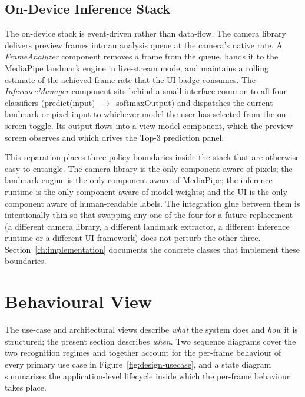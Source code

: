 \subsection{On-Device Inference Stack}
\label{sec:design-arch-ondevice}

The on-device stack is event-driven rather than data-flow. The
camera library delivers preview frames into an analysis queue at
the camera's native rate. A \emph{FrameAnalyzer} component removes
a frame from the queue, hands it to the MediaPipe landmark engine
in live-stream mode, and maintains a rolling estimate of the
achieved frame rate that the UI badge consumes. The
\emph{InferenceManager} component sits behind a small interface
common to all four classifiers
(\textsf{predict(input)}~$\to$~\textsf{softmaxOutput}) and
dispatches the current landmark or pixel input to whichever model
the user has selected from the on-screen toggle. Its output flows
into a view-model component, which the preview screen observes and
which drives the Top-3 prediction panel.

This separation places three policy boundaries inside the stack
that are otherwise easy to entangle. The camera library is the
only component aware of pixels; the landmark engine is the only
component aware of MediaPipe; the inference runtime is the only
component aware of model weights; and the UI is the only component
aware of human-readable labels. The integration glue between them
is intentionally thin so that swapping any one of the four for a
future replacement (a different camera library, a different
landmark extractor, a different inference runtime or a different
UI framework) does not perturb the other three.
Section~\ref{ch:implementation} documents the concrete classes
that implement these boundaries.

\section{Behavioural View}
\label{sec:design-sequence}

The use-case and architectural views describe \emph{what} the
system does and \emph{how} it is structured; the present section
describes \emph{when}. Two sequence diagrams cover the two
recognition regimes and together account for the per-frame
behaviour of every primary use case in
Figure~\ref{fig:design-usecase}, and a state diagram summarises the
application-level lifecycle inside which the per-frame behaviour
takes place.

